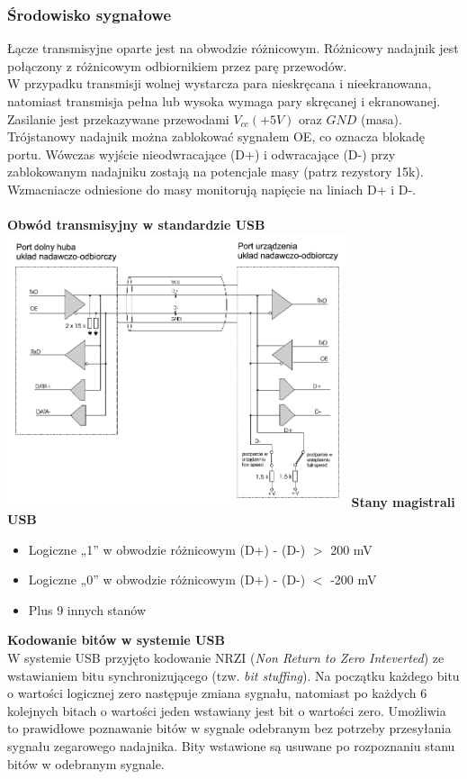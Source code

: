 		\subsubsection{Środowisko sygnałowe}
		Łącze transmisyjne oparte jest na obwodzie różnicowym. Różnicowy nadajnik jest połączony z różnicowym odbiornikiem przez parę przewodów.\\
		W przypadku transmisji wolnej wystarcza para nieskręcana i nieekranowana, natomiast transmisja pełna lub wysoka wymaga pary skręcanej i ekranowanej.\\
		Zasilanie jest przekazywane przewodami $V_{cc} (+5V)$ oraz $GND$ (masa).\\
		Trójstanowy nadajnik można zablokować sygnałem OE, co oznacza blokadę portu. Wówczas wyjście nieodwracające (D+) i odwracające (D-) przy zablokowanym nadajniku zostają na potencjale masy (patrz rezystory 15k).\\
		Wzmacniacze odniesione do masy monitorują napięcie na liniach D+ i D-.\\\\
			\textbf{Obwód transmisyjny w standardzie USB}\\
			\includegraphics[width=10cm]{./wyklady/USB_7_1.pdf}
			\textbf{Stany magistrali USB}\\
			\begin{itemize}
				\item Logiczne „1” w obwodzie różnicowym (D+) - (D-) $>$ 200 mV
				\item Logiczne „0” w obwodzie różnicowym (D+) - (D-) $<$ -200 mV
				\item Plus 9 innych stanów
			\end{itemize}
			\textbf{Kodowanie bitów w systemie USB}\\
			W systemie USB przyjęto kodowanie NRZI (\emph{Non Return to Zero Inteverted}) ze wstawianiem bitu synchronizującego (tzw. \emph{bit stuffing}). Na początku każdego bitu o wartości logicznej zero następuje zmiana sygnału, natomiast po każdych 6 kolejnych bitach o wartości jeden wstawiany jest bit o wartości zero. Umożliwia to prawidłowe poznawanie bitów w sygnale odebranym bez potrzeby przesyłania sygnału zegarowego nadajnika. Bity wstawione są usuwane po rozpoznaniu stanu bitów w odebranym sygnale.\\\\
